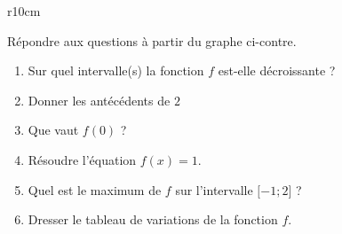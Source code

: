 
\begin{exercice}\label{exosmath-0516}

\begin{wrapfigure}{r}{10cm}
   \vspace{-0.5cm}        %
   \centering
   
\end{wrapfigure}

    Répondre aux questions à partir du graphe ci-contre.
    \begin{enumerate}
        \item
            Sur quel intervalle(s) la fonction \( f\) est-elle décroissante ?
        \item
            Donner les antécédents de \( 2\)
        \item
            Que vaut \( f(0)\) ?
        \item
            Résoudre l'équation \( f(x)=1\).
        \item
            Quel est le maximum de \( f\) sur l'intervalle \( \mathopen[ -1 ; 2 \mathclose]\) ?
        \item
            Dresser le tableau de variations de la fonction \( f\).
    \end{enumerate}

\end{exercice}
